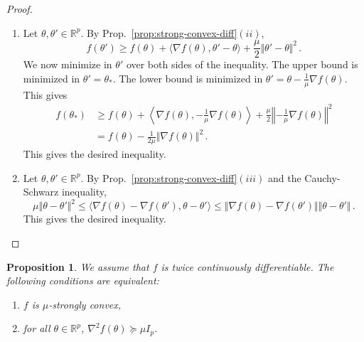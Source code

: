 \documentclass[11pt,reqno]{article}
\newcommand{\R}{\mathbb{R}}
\renewcommand{\leq}{\leqslant}
\renewcommand{\geq}{\geqslant}
\numberwithin{equation}{section}
\theoremstyle{plain}
\newtheorem{proposition}[assumption]{Proposition}
\theoremstyle{definition}
\theoremstyle{remark}
\begin{document}
\begin{proof}
\begin{enumerate}[label=\itshape(\roman*)]
		We now show the uniqueness of this global minimizer. Let $\theta_*$, $\theta_*'$ be two global minimizers of $f$. By the definition of strong convexity, we have 
		\begin{equation*}
			f\left(\frac{\theta_*+\theta_*'}{2}\right) \leq \frac{f(\theta_*) + f(\theta_*')}{2} - \frac{\mu}{2} \frac{1}{4} \Vert \theta_* - \theta_*' \Vert^2 \, .
		\end{equation*}
		Here, by optimality of $\theta_*$ and $\theta_*'$, $f\left(\frac{\theta_*+\theta_*'}{2}\right) \geq f(\theta_*) = f(\theta_*')$. Thus we must have $\Vert \theta_* - \theta_*' \Vert^2 = 0$. This proves the uniqueness. 
		\item Let $\theta, \theta' \in \R^p$. By Prop.~\ref{prop:strong-convex-diff}$(ii)$,
		\begin{equation*}
			f(\theta') \geq f(\theta) + \langle \nabla f(\theta), \theta' - \theta \rangle + \frac{\mu}{2} \Vert \theta' - \theta \Vert^2 \, .
		\end{equation*}
		We now minimize in $\theta'$ over both sides of the inequality. The upper bound is minimized in $\theta' = \theta_*$. The lower bound is minimized in $\theta' = \theta - \frac{1}{\mu} \nabla f(\theta)$. This gives 
		\begin{align*}
			f(\theta_*) &\geq f(\theta) + \left\langle \nabla f(\theta), -\frac{1}{\mu} \nabla f(\theta) \right\rangle + \frac{\mu}{2} \left\Vert -\frac{1}{\mu} \nabla f(\theta) \right\Vert^2\\
			&= f(\theta) - \frac{1}{2\mu} \Vert \nabla f(\theta) \Vert^2 \, .
		\end{align*}
		This gives the desired inequality.
		\item Let $\theta, \theta' \in \R^p$. By Prop.~\ref{prop:strong-convex-diff}$(iii)$ and the Cauchy-Schwarz inequality,
		\begin{equation*}
			\mu \Vert \theta - \theta' \Vert^2 \leq \langle \nabla f(\theta) - \nabla f(\theta'), \theta - \theta' \rangle \leq \Vert \nabla f(\theta) - \nabla f(\theta') \Vert \Vert \theta - \theta' \Vert \, .
		\end{equation*}
		This gives the desired inequality.
	\end{enumerate}
\end{proof}



\begin{proposition}
	We assume that $f$ is twice continuously differentiable. The following conditions are equivalent:
	\begin{enumerate}[label=(\roman*)]
		\item $f$ is $\mu$-strongly convex,
		\item for all $\theta \in \R^p$, $\nabla^2 f(\theta) \succcurlyeq \mu I_p$.
	\end{enumerate}
\end{proposition}
\end{document}
